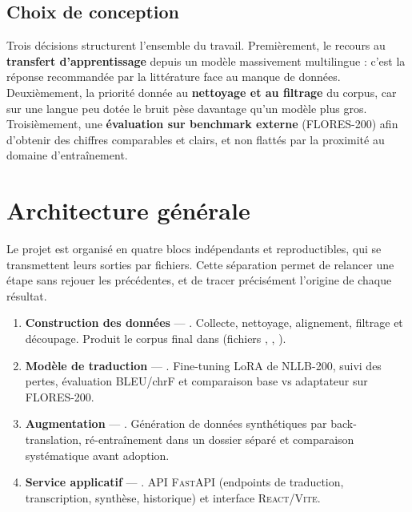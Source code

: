 \documentclass[11pt,a4paper]{article}
\begin{document}
\subsection{Choix de conception}
Trois décisions structurent l'ensemble du travail. Premièrement, le recours au
\textbf{transfert d'apprentissage} depuis un modèle massivement multilingue : c'est la
réponse recommandée par la littérature face au manque de données. Deuxièmement, la
priorité donnée au \textbf{nettoyage et au filtrage} du corpus, car sur une langue peu
dotée le bruit pèse davantage qu'un modèle plus gros. Troisièmement, une
\textbf{évaluation sur benchmark externe} (FLORES-200) afin d'obtenir des chiffres
comparables et clairs, et non flattés par la proximité au domaine d'entraînement.

\section{Architecture générale}

Le projet est organisé en quatre blocs indépendants et reproductibles, qui se
transmettent leurs sorties par fichiers. Cette séparation permet de relancer une étape
sans rejouer les précédentes, et de tracer précisément l'origine de chaque résultat.

\begin{enumerate}[leftmargin=1.6em,itemsep=4pt]
  \item \textbf{Construction des données} — . Collecte,
        nettoyage, alignement, filtrage et découpage. Produit le corpus final dans
         (fichiers , ,
        ).
  \item \textbf{Modèle de traduction} — .
        Fine-tuning LoRA de NLLB-200, suivi des pertes, évaluation BLEU/chrF et
        comparaison base vs adaptateur sur FLORES-200.
  \item \textbf{Augmentation} — .
        Génération de données synthétiques par back-translation, ré-entraînement dans un
        dossier séparé et comparaison systématique avant adoption.
  \item \textbf{Service applicatif} — . API \textsc{FastAPI}
        (endpoints de traduction, transcription, synthèse, historique) et interface
        \textsc{React}/\textsc{Vite}.
\end{enumerate}
\end{document}
